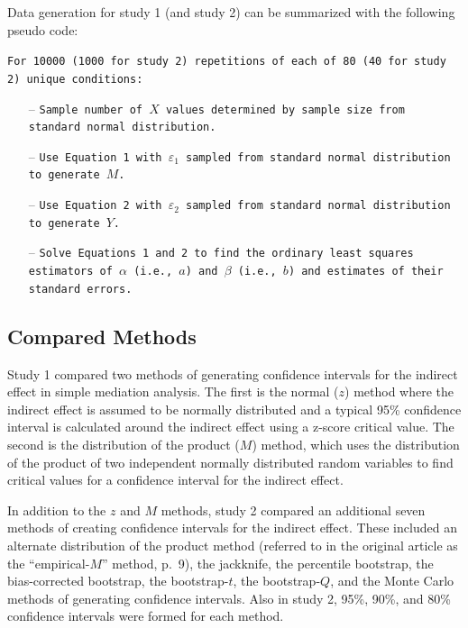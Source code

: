 \documentclass[10,a4paperpaper,]{article}
\begin{document}
\begin{minipage}{\linewidth}
Data generation for study 1 (and study 2) can be summarized with the following pseudo code:

\texttt{For 10000 (1000 for study 2) repetitions of each of 80 (40 for study 2) unique conditions:}
\begin{itemize}[leftmargin=*] 
    \item[--] \texttt{Sample number of $X$ values determined by sample size from standard normal distribution.}
    \item[--] \texttt{Use Equation 1 with $\varepsilon_1$ sampled from standard normal distribution to generate $M$.}
    \item[--] \texttt{Use Equation 2 with $\varepsilon_2$ sampled from standard normal distribution to generate $Y$.}
    \item[--] \texttt{Solve Equations 1 and 2 to find the ordinary least squares estimators of $\alpha$ (i.e., $a$) and $\beta$ (i.e., $b$) and estimates of their standard errors.}
\end{itemize}
\end{minipage}

\subsection{Compared Methods}

Study 1 compared two methods of generating confidence intervals for the
indirect effect in simple mediation analysis. The first is the normal
(\(z\)) method where the indirect effect is assumed to be normally
distributed and a typical 95\% confidence interval is calculated around
the indirect effect using a z-score critical value. The second is the
distribution of the product (\(M\)) method, which uses the distribution
of the product of two independent normally distributed random variables
to find critical values for a confidence interval for the indirect
effect.

In addition to the \(z\) and \(M\) methods, study 2 compared an
additional seven methods of creating confidence intervals for the
indirect effect. These included an alternate distribution of the product
method (referred to in the original article as the ``empirical-\(M\)''
method, p.~9), the jackknife, the percentile bootstrap, the
bias-corrected bootstrap, the bootstrap-\(t\), the bootstrap-\(Q\), and
the Monte Carlo methods of generating confidence intervals. Also in
study 2, 95\%, 90\%, and 80\% confidence intervals were formed for each
method.
\end{document}
